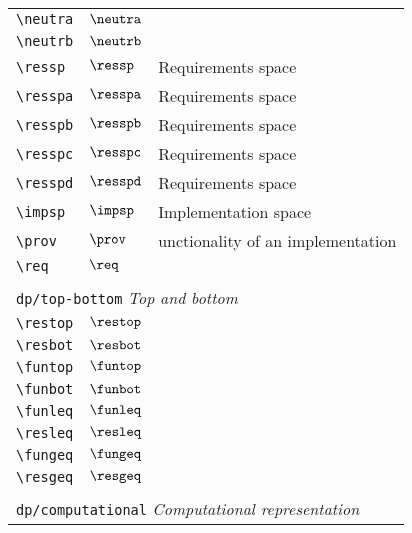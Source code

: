 \begin{longtable}{lll}
 {\color[rgb]{0.5,0.5,0.5}\texttt{\textbackslash neutra}} & $\neutra$ & \\ 
 {\color[rgb]{0.5,0.5,0.5}\texttt{\textbackslash neutrb}} & $\neutrb$ & \\ 
 {\color[rgb]{0.5,0.5,0.5}\texttt{\textbackslash ressp}} & $\ressp$ &  Requirements space\\ 
 {\color[rgb]{0.5,0.5,0.5}\texttt{\textbackslash resspa}} & $\resspa$ &  Requirements space\\ 
 {\color[rgb]{0.5,0.5,0.5}\texttt{\textbackslash resspb}} & $\resspb$ &  Requirements space\\ 
 {\color[rgb]{0.5,0.5,0.5}\texttt{\textbackslash resspc}} & $\resspc$ &  Requirements space\\ 
 {\color[rgb]{0.5,0.5,0.5}\texttt{\textbackslash resspd}} & $\resspd$ &  Requirements space\\ 
 {\color[rgb]{0.5,0.5,0.5}\texttt{\textbackslash impsp}} & $\impsp$ &  Implementation space\\ 
 {\color[rgb]{0.5,0.5,0.5}\texttt{\textbackslash prov}} & $\prov$ &  unctionality of an implementation\\ 
 {\color[rgb]{0.5,0.5,0.5}\texttt{\textbackslash req}} & $\req$ & \\ 
  &  & \\ 
 \multicolumn{3}{l}{{\color[rgb]{0.5,0.5,0.5}\texttt{dp/top-bottom}} \emph{Top and bottom}}\\ 
 \hline
{\color[rgb]{0.5,0.5,0.5}\texttt{\textbackslash restop}} & $\restop$ & \\ 
 {\color[rgb]{0.5,0.5,0.5}\texttt{\textbackslash resbot}} & $\resbot$ & \\ 
 {\color[rgb]{0.5,0.5,0.5}\texttt{\textbackslash funtop}} & $\funtop$ & \\ 
 {\color[rgb]{0.5,0.5,0.5}\texttt{\textbackslash funbot}} & $\funbot$ & \\ 
 {\color[rgb]{0.5,0.5,0.5}\texttt{\textbackslash funleq}} & $\funleq$ & \\ 
 {\color[rgb]{0.5,0.5,0.5}\texttt{\textbackslash resleq}} & $\resleq$ & \\ 
 {\color[rgb]{0.5,0.5,0.5}\texttt{\textbackslash fungeq}} & $\fungeq$ & \\ 
 {\color[rgb]{0.5,0.5,0.5}\texttt{\textbackslash resgeq}} & $\resgeq$ & \\ 
  &  & \\ 
 \multicolumn{3}{l}{{\color[rgb]{0.5,0.5,0.5}\texttt{dp/computational}} \emph{Computational representation}}\\ 

\end{longtable}
